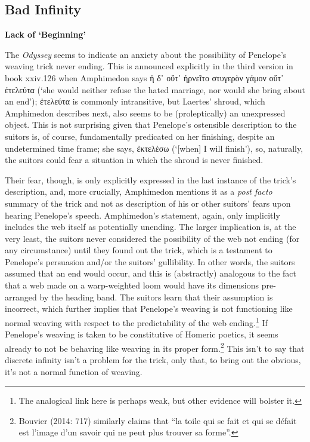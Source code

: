\documentclass[12pt]{article}
\begin{document}
\subsection{ Bad Infinity}

\textbf{Lack of `Beginning'}

The \textit{Odyssey} seems to indicate an anxiety about the possibility of Penelope's weaving trick never ending. This is announced explicitly in the third version in book xxiv.126 when Amphimedon says ἡ δ᾿ οὔτ᾿ ἠρνεῖτο στυγερὸν γάμον οὔτ᾿ ἐτελεύτα (`she would neither refuse the hated marriage, nor would she bring about an end'); ἐτελεύτα is commonly intransitive, but Laertes' shroud, which Amphimedon describes next, also seems to be (proleptically) an unexpressed object. This is not surprising given that Penelope's ostensible description to the suitors is, of course, fundamentally predicated on her finishing, despite an undetermined time frame; she says, ἐκτελέσω (`[when] I will finish'), so, naturally, the suitors could fear a situation in which the shroud is never finished.

Their fear, though, is only explicitly expressed in the last instance of the trick's description, and, more crucially, Amphimedon mentions it as a \textit{post facto} summary of the trick and not as description of his or other suitors' fears upon hearing Penelope's speech. Amphimedon's statement, again, only implicitly includes the web itself as potentially unending. The larger implication is, at the very least, the suitors never considered the possibility of the web not ending (for any circumstance) until they found out the trick, which is a testament to Penelope's persuasion and/or the suitors' gullibility. In other words, the suitors assumed that an end would occur, and this is (abstractly) analogous to the fact that a web made on a warp-weighted loom would have its dimensions pre-arranged by the heading band. The suitors learn that their assumption is incorrect, which further implies that Penelope's weaving is not functioning like normal weaving with respect to the predictability of the web ending.\footnote{ The analogical link here is perhaps weak, but other evidence will bolster it.} If Penelope's weaving is taken to be constitutive of Homeric poetics, it seems already to not be behaving like weaving in its proper form.\footnote{ Bouvier (2014: 717) similarly claims that ``la toile qui se fait et qui se d\'{e}fait est l'image d'un savoir qui ne peut plus trouver sa forme''.} This isn't to say that discrete infinity isn't a problem for the trick, only that, to bring out the obvious, it's not a normal function of weaving.
\end{document}

